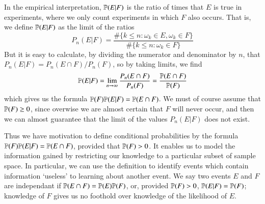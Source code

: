 In the empirical interpretation, $\mathbb{P}(E | F)$ is the ratio of times that $E$ is true in experiments, where we only count experiments in which $F$ also occurs. That is, we define $\mathbb{P}(E | F)$ as the limit of the ratios
%
\[ P_n(E|F) = \frac{\# \{ k \leq n: \omega_k \in E, \omega_k \in F \}}{\# \{ k \leq n: \omega_k \in F \}} \]
%
But it is easy to calculate, by dividing the numerator and denominator by $n$, that $P_n(E|F) = P_n(E \cap F)/P_n(F)$, so by taking limits, we find
%
\[ \mathbb{P}(E|F) = \lim_{n \to \infty} \frac{P_n(E \cap F)}{P_n(F)} = \frac{\mathbb{P}(E \cap F)}{\mathbb{P}(F)} \]
%
which gives us the formula $\mathbb{P}(F) \mathbb{P}(E | F) = \mathbb{P}(E \cap F)$. We must of course assume that $\mathbb{P}(F) \geq 0$, since overwise we are almost certain that $F$ will never occur, and then we can almost guarantee that the limit of the values $P_n(E|F)$ does not exist.

Thus we have motivation to define conditional probabilities by the formula $\mathbb{P}(F) \mathbb{P}(E|F) = \mathbb{P}(E \cap F)$, provided that $\mathbb{P}(F) > 0$. It enables us to model the information gained by restricting our knowledge to a particular subset of sample space. In particular, we can use the definition to identify events which contain information `useless' to learning about another event. We say two events $E$ and $F$ are independant if $\mathbb{P}(E \cap F) = \mathbb{P}(E) \mathbb{P}(F)$, or, provided $\mathbb{P}(F) > 0$, $\mathbb{P}(E | F) = \mathbb{P}(F)$; knowledge of $F$ gives us no foothold over knowledge of the likelihood of $E$.

